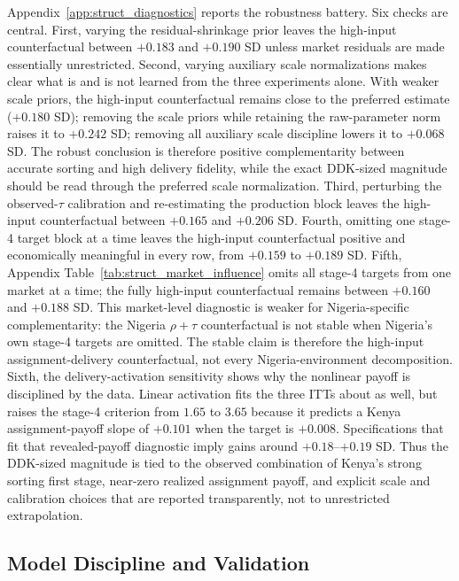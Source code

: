 \documentclass[11pt]{article}
\begin{document}
Appendix~\ref{app:struct_diagnostics} reports the robustness battery. Six checks are central. First, varying the residual-shrinkage prior leaves the high-input counterfactual between $+0.183$ and $+0.190$ SD unless market residuals are made essentially unrestricted. Second, varying auxiliary scale normalizations makes clear what is and is not learned from the three experiments alone. With weaker scale priors, the high-input counterfactual remains close to the preferred estimate ($+0.180$ SD); removing the scale priors while retaining the raw-parameter norm raises it to $+0.242$ SD; removing all auxiliary scale discipline lowers it to $+0.068$ SD. The robust conclusion is therefore positive complementarity between accurate sorting and high delivery fidelity, while the exact DDK-sized magnitude should be read through the preferred scale normalization. Third, perturbing the observed-$\tau$ calibration and re-estimating the production block leaves the high-input counterfactual between $+0.165$ and $+0.206$ SD. Fourth, omitting one stage-4 target block at a time leaves the high-input counterfactual positive and economically meaningful in every row, from $+0.159$ to $+0.189$ SD. Fifth, Appendix Table~\ref{tab:struct_market_influence} omits all stage-4 targets from one market at a time; the fully high-input counterfactual remains between $+0.160$ and $+0.188$ SD. This market-level diagnostic is weaker for Nigeria-specific complementarity: the Nigeria $\rho+\tau$ counterfactual is not stable when Nigeria's own stage-4 targets are omitted. The stable claim is therefore the high-input assignment-delivery counterfactual, not every Nigeria-environment decomposition. Sixth, the delivery-activation sensitivity shows why the nonlinear payoff is disciplined by the data. Linear activation fits the three ITTs about as well, but raises the stage-4 criterion from $1.65$ to $3.65$ because it predicts a Kenya assignment-payoff slope of $+0.101$ when the target is $+0.008$. Specifications that fit that revealed-payoff diagnostic imply gains around $+0.18$--$+0.19$ SD. Thus the DDK-sized magnitude is tied to the observed combination of Kenya's strong sorting first stage, near-zero realized assignment payoff, and explicit scale and calibration choices that are reported transparently, not to unrestricted extrapolation.

\subsection{Model Discipline and Validation}
\label{subsec:struct_acceptance}
\end{document}
